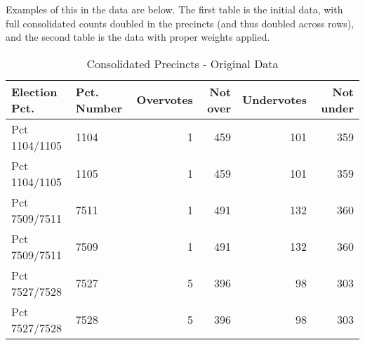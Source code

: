 \documentclass[12pt,twoside]{reedthesis}
\newenvironment{Shaded}{\begin{snugshade}}{\end{snugshade}}
\newcommand{\DataTypeTok}[1]{\textcolor[rgb]{0.13,0.29,0.53}{#1}}
\newcommand{\DecValTok}[1]{\textcolor[rgb]{0.00,0.00,0.81}{#1}}
\newcommand{\KeywordTok}[1]{\textcolor[rgb]{0.13,0.29,0.53}{\textbf{#1}}}
\newcommand{\NormalTok}[1]{#1}
\newcommand{\OperatorTok}[1]{\textcolor[rgb]{0.81,0.36,0.00}{\textbf{#1}}}
\newcommand{\OtherTok}[1]{\textcolor[rgb]{0.56,0.35,0.01}{#1}}
\newcommand{\StringTok}[1]{\textcolor[rgb]{0.31,0.60,0.02}{#1}}
\theoremstyle{definition}
\theoremstyle{definition}
\theoremstyle{definition}
\theoremstyle{remark}
\begin{document}
Examples of this in the data are below. The first table is the initial
data, with full consolidated counts doubled in the precincts (and thus
doubled across rows), and the second table is the data with proper
weights applied.
\begin{Shaded}
\end{Shaded}
\begin{longtable}[t]{llrrrr}
\caption[Combined Precincts - Original]{\label{tab:unnamed-chunk-7}Consolidated Precincts - Original Data}\\
\toprule
Election Pct. & Pct. Number & Overvotes & Not over & Undervotes & Not under\\
\midrule
Pct 1104/1105 & 1104 & 1 & 459 & 101 & 359\\
Pct 1104/1105 & 1105 & 1 & 459 & 101 & 359\\
Pct 7509/7511 & 7511 & 1 & 491 & 132 & 360\\
Pct 7509/7511 & 7509 & 1 & 491 & 132 & 360\\
Pct 7527/7528 & 7527 & 5 & 396 & 98 & 303\\
Pct 7527/7528 & 7528 & 5 & 396 & 98 & 303\\
\bottomrule
\end{longtable}
\end{document}
